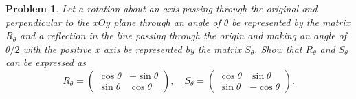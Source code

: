 \documentclass[UTF8,10pt,a4paper]{article}
\theoremstyle{Problem}
\newtheorem{prob}{Problem}
\theoremstyle{Solution}
\begin{document}
\begin{prob}
    Let a rotation about an axis passing through the original and perpendicular to the $xOy$ plane through an angle of $\theta$ be represented by the matrix $R_{\theta}$ and a reflection in the line passing through the origin and making an angle of $\theta/2$ with the positive $x$ axis be represented by the matrix $S_{\theta}$. Show that $R_{\theta}$ and $S_{\theta}$ can be expressed as
    \[
        R_{\theta}=\left(\begin{matrix}
            \cos\theta&-\sin\theta\\
            \sin\theta&\cos\theta
        \end{matrix}\right),\quad S_{\theta}=\left(\begin{matrix}
            \cos\theta&\sin\theta\\
            \sin\theta&-\cos\theta
        \end{matrix}\right).
    \]
\end{prob}
\end{document}
